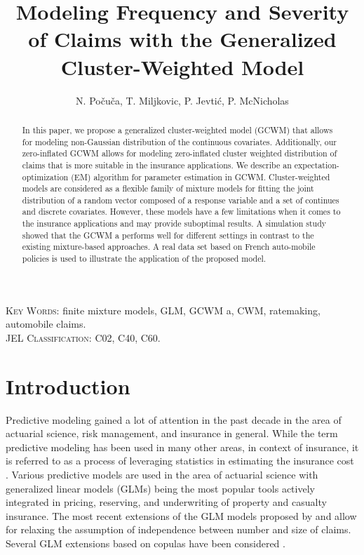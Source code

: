 \documentclass[11pt,letterpaper]{article}
\numberwithin{equation}{section}
\numberwithin{equation}{section}
\numberwithin{equation}{section}
\begin{document}
\title{\bf Modeling  Frequency and Severity of Claims with the Generalized  Cluster-Weighted Model}

\author{N. Po\v cu\v ca, T. Miljkovic,  P. Jevti\' c, P. McNicholas  }%

\maketitle
\doublespacing
\small

\begin{abstract}

In this paper, we propose a generalized cluster-weighted  model (GCWM) that allows for modeling non-Gaussian distribution of the continuous covariates. Additionally, our zero-inflated GCWM allows for modeling zero-inflated cluster weighted distribution of claims that is more suitable in the insurance applications. We describe an expectation-optimization (EM) algorithm for parameter estimation in GCWM. Cluster-weighted models are considered as a flexible family of mixture models for fitting the joint distribution of a random vector composed of a response variable and a set of continues and discrete covariates. However, these models have a few limitations when it comes to the insurance applications and may provide suboptimal results. A simulation study showed that the GCWM a performs well for different settings in contrast to the existing mixture-based approaches. A real data set based on French auto-mobile policies is used to illustrate the application of the proposed model.

\end{abstract}
\textsc{Key Words:} finite mixture models, GLM, GCWM a, CWM, ratemaking, automobile claims.\\
\textsc{JEL Classification:}  C02, C40, C60.\\
\section{Introduction}\label{sec:introduction}
Predictive modeling gained a lot of attention in the past decade in the area of actuarial science, risk management, and insurance in general. While the term predictive modeling has been used in many other areas, in context of insurance, it is referred to as a process of leveraging statistics in estimating the insurance cost \citep[see][]{Frees+Derrig+Meyer:2014}. Various predictive models are used in the area of actuarial science with generalized linear models (GLMs) being the most popular tools actively integrated in pricing, reserving, and underwriting of property and casualty insurance. The most recent extensions of the GLM models proposed by \cite{Garrido+Genest+Schulz:2016} and \cite{Shi+Feng+Ivantsova:2015} allow for relaxing the assumption of independence between number and size of claims. Several GLM extensions based on copulas have been considered \citep[e.g.,][]{Frees+Lee+Yang:2016,Kramer+Brechmann+Silvestrini+Czado:2013, Czado+Kastenmeier+Brechmann+Min:2012,Frees+Wang:2006}.
\end{document}
